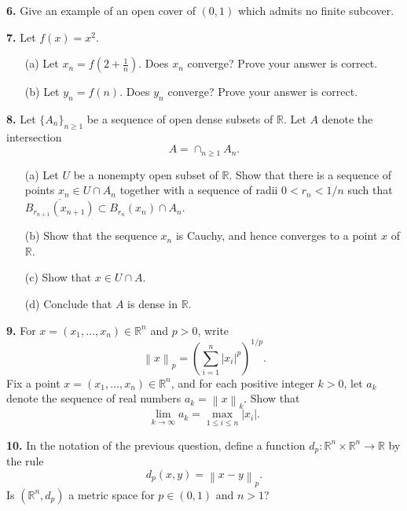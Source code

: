 \documentclass[12pt]{article}
\newcommand{\norm}[1]{\left\lVert#1\right\rVert}
\begin{document}
\medskip

\noindent \textbf{6.} Give an example of an open cover of $(0,1)$ which admits no finite subcover. 

\medskip

\noindent \textbf{7.} Let $f(x) = x^2$. 
\begin{enumerate}
\item[(a)] Let $x_n = f(2 + \tfrac{1}{n})$. Does $x_n$ converge? Prove your answer is correct. 
\item[(b)] Let $y_n = f(n)$. Does $y_n$ converge? Prove your answer is correct. 
\end{enumerate}

\medskip


\noindent \textbf{8.} Let $\{A_n\}_{n \geqslant 1}$ be a sequence of open dense subsets of $\mathbb{R}$. Let $A$ denote the intersection 
\[
A = \cap_{n \geqslant 1} A_n.
\]
\begin{enumerate}
\item[(a)] Let $U$ be a nonempty open subset of $\mathbb{R}$. Show that there is a sequence of points $x_n \in U \cap A_n$ together with a sequence of radii $0 < r_n < 1/n$ such that $\overline{B_{r_{n+1}}(x_{n+1})} \subset B_{r_n}(x_n) \cap A_n$.
\item[(b)] Show that the sequence $x_n$ is Cauchy, and hence converges to a point $x$ of $\mathbb{R}$. 
\item[(c)] Show that $x \in U \cap A$. 
\item[(d)] Conclude that $A$ is dense in $\mathbb{R}$. 
\end{enumerate}


\noindent \textbf{9.} For $x = (x_1, \ldots, x_n) \in \mathbb{R}^n$ and $p > 0$, write 
\[
\norm{x}_p = \left(\sum_{i=1}^n |x_i|^p\right)^{1/p}.
\]
Fix a point $x = (x_1, \ldots, x_n) \in \mathbb{R}^n$, and for each positive integer $k > 0$, let $a_k$ denote the sequence of real numbers $a_k = \norm{x}_{k}$.  Show that 
\[
\lim_{k \to \infty} a_k = \max_{1 \leqslant i \leqslant n} |x_i|. 
\]

\medskip 

\noindent\textbf{10.} In the notation of the previous question, define a function $d_p : \mathbb{R}^n \times \mathbb{R}^n \to \mathbb{R}$ by the rule 
\[
d_p(x,y) = \norm{x - y}_p.
\]
Is $(\mathbb{R}^n, d_p)$ a metric space for $p \in (0,1)$ and $n > 1$? 
\end{document}
